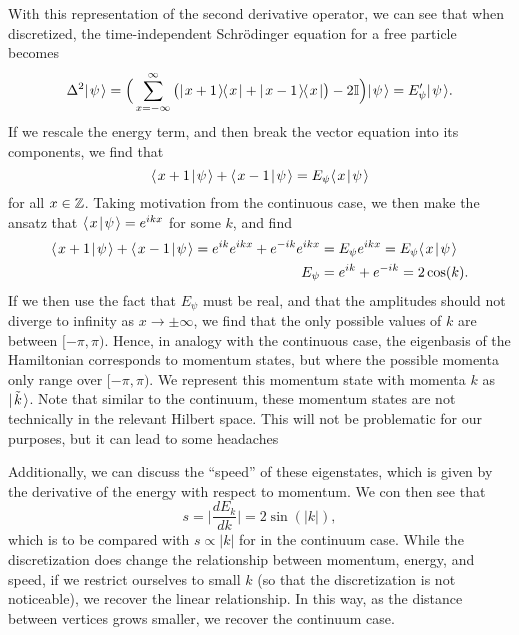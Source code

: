 \documentclass[../thesis-main/thesis-main]{subfiles}
\begin{document}
With this representation of the second derivative operator, we can see that when discretized, the time-independent Schr\"{o}dinger equation for a free particle becomes
\begin{equation}
  \Delta^2 |\mspace{2mu} \psi \mspace{2mu} \rangle = \Big(\sum_{x=-\infty}^\infty \big(|\mspace{2mu} x+1 \mspace{2mu} \rangle\mspace{-2mu}\langle\mspace{2mu} x \mspace{2mu} | + |\mspace{2mu} x-1 \mspace{2mu} \rangle\mspace{-2mu}\langle\mspace{2mu} x \mspace{2mu} |\big) - 2 \mathbb{I}\Big) |\mspace{2mu} \psi \mspace{2mu} \rangle = E'_{\psi} |\mspace{2mu} \psi \mspace{2mu} \rangle.
\end{equation}
If we rescale the energy term, and then break the vector equation into its components, we find that
\begin{equation}
  \langle\mspace{2mu} x+1 \mspace{2mu} | \mspace{2mu} \psi\mspace{2mu} \rangle + \langle\mspace{2mu} x-1 \mspace{2mu} | \mspace{2mu} \psi\mspace{2mu} \rangle = E_\psi \langle\mspace{2mu} x \mspace{2mu} | \mspace{2mu} \psi\mspace{2mu} \rangle
\end{equation}
for all $x\in \mathbb{Z}$.  Taking motivation from the continuous case,  we then make the ansatz that $\langle\mspace{2mu} x \mspace{2mu} | \mspace{2mu} \psi\mspace{2mu} \rangle = e^{i k x}$ for some $k$, and find
\begin{align}
  \langle\mspace{2mu} x+1 \mspace{2mu} | \mspace{2mu} \psi\mspace{2mu} \rangle + \langle\mspace{2mu} x-1 \mspace{2mu} | \mspace{2mu} \psi\mspace{2mu} \rangle = e^{i k } e^{i k x} + e^{-ik} e^{ikx} &= E_\psi e^{ik x} = E_\psi \langle\mspace{2mu} x \mspace{2mu} | \mspace{2mu} \psi\mspace{2mu} \rangle  \\ E_\psi &= e^{ik} + e^{-i k} = 2 \cos(k).
\end{align}
If we then use the fact that $E_\psi$ must be real, and that the amplitudes should not diverge to infinity as $x\rightarrow \pm \infty$, we find that the only possible values of $k$ are between $[-\pi,\pi)$.    Hence, in analogy with the continuous case, the eigenbasis of the Hamiltonian corresponds to momentum states, but where the possible momenta only range over $[-\pi,\pi)$.  We represent this momentum state with momenta $k$ as $|\mspace{2mu} \tilde{k} \mspace{2mu} \rangle$.  Note that similar to the continuum, these momentum states are not technically in the relevant Hilbert space.  This will not be problematic for our purposes, but it can lead to some headaches

Additionally, we can discuss the ``speed'' of these eigenstates, which is given by the derivative of the energy with respect to momentum.  We con then see that 
\begin{equation}
  s = \Big| \frac{d E_k}{d k} \Big| = 2 \sin (|k|),
\end{equation}
which is to be compared with $s \propto |k|$ for in the continuum case.  While the discretization does change the relationship between momentum, energy, and speed, if we restrict ourselves to small $k$ (so that the discretization is not noticeable), we recover the linear relationship.  In this way, as the distance between vertices grows smaller, we recover the continuum case.  
\end{document}
